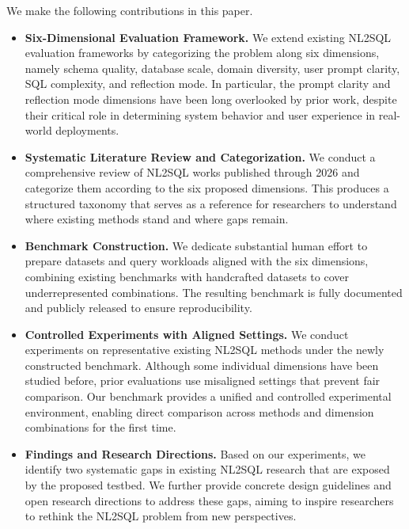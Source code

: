 We make the following contributions in this paper.

\begin{itemize}

\item \textbf{Six-Dimensional Evaluation Framework.}
We extend existing NL2SQL evaluation frameworks by categorizing the problem along six dimensions, namely schema quality, database scale, domain diversity, user prompt clarity, SQL complexity, and reflection mode. In particular, the prompt clarity and reflection mode dimensions have been long overlooked by prior work, despite their critical role in determining system behavior and user experience in real-world deployments.

\item \textbf{Systematic Literature Review and Categorization.}
We conduct a comprehensive review of NL2SQL works published through 2026 and categorize them according to the six proposed dimensions. This produces a structured taxonomy that serves as a reference for researchers to understand where existing methods stand and where gaps remain.

\item \textbf{Benchmark Construction.}
We dedicate substantial human effort to prepare datasets and query workloads aligned with the six dimensions, combining existing benchmarks with handcrafted datasets to cover underrepresented combinations. The resulting benchmark is fully documented and publicly released to ensure reproducibility.

\item \textbf{Controlled Experiments with Aligned Settings.}
We conduct experiments on representative existing NL2SQL methods under the newly constructed benchmark. Although some individual dimensions have been studied before, prior evaluations use misaligned settings that prevent fair comparison. Our benchmark provides a unified and controlled experimental environment, enabling direct comparison across methods and dimension combinations for the first time.

\item \textbf{Findings and Research Directions.}
Based on our experiments, we identify two systematic gaps in existing NL2SQL research that are exposed by the proposed testbed. We further provide concrete design guidelines and open research directions to address these gaps, aiming to inspire researchers to rethink the NL2SQL problem from new perspectives.

\end{itemize}
